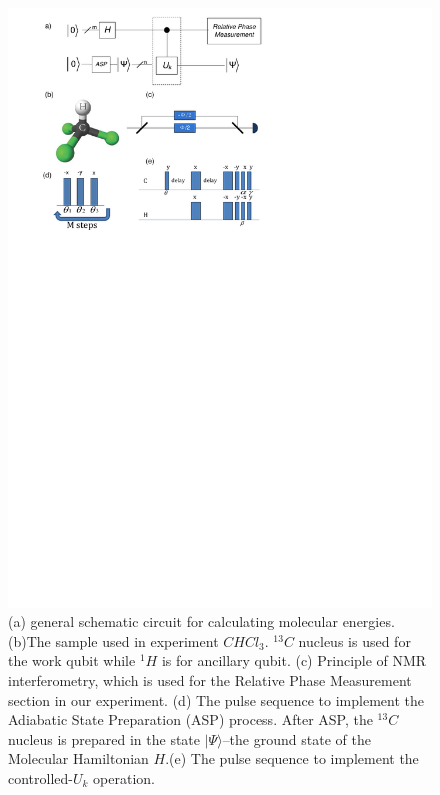 \documentclass[twocolumn,showpacs,twoside,10pt,superscriptaddress,prl]{revtex4}
\begin{document}
\begin{figure}[htb]
\begin{center}
\includegraphics[width= 0.99\columnwidth]{circuit_exp}
\end{center}
\caption{(a) general schematic circuit for calculating molecular
energies. (b)The sample used in experiment $CHCl_{3}$. $^{13}C$
nucleus is used for the work qubit while $^{1}H$ is for ancillary
qubit. (c) Principle of NMR interferometry, which is used for the
Relative Phase Measurement section in our experiment. (d) The pulse
sequence to implement the Adiabatic State Preparation (ASP) process.
After ASP, the $^{13}C$ nucleus is prepared in the state
$|\Psi\rangle$--the ground state of the Molecular Hamiltonian
$H$.(e) The pulse sequence to implement the controlled-$U_k$
operation.}\label{circuit_exp}
\end{figure}
\end{document}
